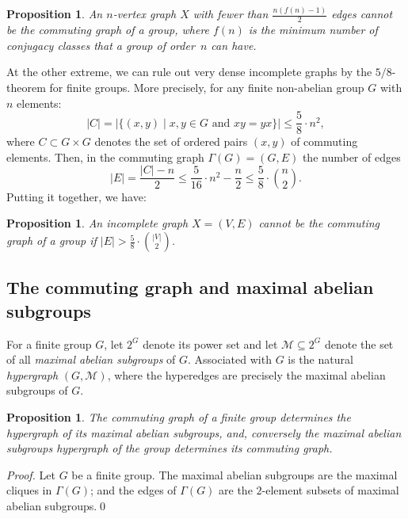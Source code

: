 \documentclass{elsarticle}
\newtheorem{prop}[theorem]{Proposition}
\begin{document}
\begin{prop}
  An $n$-vertex graph $X$ with fewer than $\frac{n(f(n)-1)}{2}$ edges
  cannot be the commuting graph of a group, where $f(n)$ is the
  minimum number of conjugacy classes that a group of order~$n$ can have.
\end{prop}

At the other extreme, we can rule out very dense incomplete graphs by
the $5/8$-theorem \cite{Gu73} for finite groups. More precisely, for
any finite non-abelian group $G$ with $n$ elements:
\[
|C|=|\{(x,y)\mid x,y\in G \textrm{ and } xy=yx\}|\le \frac{5}{8}\cdot n^2,
\]
where $C\subset G\times G$ denotes the set of ordered pairs $(x,y)$ of
commuting elements. Then, in the commuting graph $\Gamma(G)=(G,E)$
the number of edges
\[
|E|=\frac{|C|-n}{2}\le \frac{5}{16}\cdot n^2 -\frac{n}{2}\le \frac{5}{8}\cdot{n\choose 2}.
\]
Putting it together, we have:
\begin{prop}
  An incomplete graph $X=(V,E)$ cannot be the commuting graph of a group
  if $|E|>\frac{5}{8}\cdot {|V|\choose 2}$.
\end{prop}

\subsection{The commuting graph and maximal abelian subgroups}

For a finite group $G$, let $2^G$ denote its power set and let
$\mathcal{M}\subseteq 2^G$ denote the set of all \emph{maximal abelian
  subgroups} of $G$. Associated with $G$ is the natural
\emph{hypergraph} $(G,\mathcal{M})$, where the hyperedges are
precisely the maximal abelian subgroups of $G$.

\begin{prop}\label{max-abel-subgps}
  The commuting graph of a finite group determines the hypergraph of
  its maximal abelian subgroups, and, conversely the maximal abelian
  subgroups hypergraph of the group determines its commuting graph.
\end{prop}

\begin{proof}
  Let $G$ be a finite group. The maximal abelian subgroups are the maximal
  cliques in $\Gamma(G)$; and the edges of $\Gamma(G)$ are the $2$-element
  subsets of maximal abelian subgroups.\qed
\end{proof}
\end{document}
